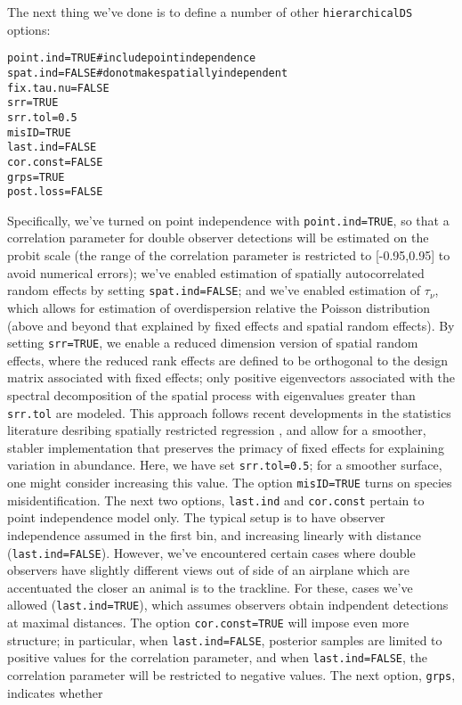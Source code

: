 \documentclass{article}\usepackage{graphicx, color}
\makeatletter
\newcommand{\hlcomment}[1]{\textcolor[rgb]{0.180392156862745,0.6,0.341176470588235}{#1}}%
\newenvironment{kframe}{%
 \def\at@end@of@kframe{}%
 \ifinner\ifhmode%
  \def\at@end@of@kframe{\end{minipage}}%
  \begin{minipage}{\columnwidth}%
 \fi\fi%
 \def\FrameCommand##1{\hskip\@totalleftmargin \hskip-\fboxsep
 \colorbox{shadecolor}{##1}\hskip-\fboxsep
     \hskip-\linewidth \hskip-\@totalleftmargin \hskip\columnwidth}%
 \MakeFramed {\advance\hsize-\width
   \@totalleftmargin\z@ \linewidth\hsize
   \@setminipage}}%
 {\par\unskip\endMakeFramed%
 \at@end@of@kframe}
\newenvironment{knitrout}{}{} %
\makeatother
\begin{document}
The next thing we've done is to define a number of other \texttt{hierarchicalDS} options:

\begin{knitrout}
\color{fgcolor}\begin{kframe}
\begin{alltt}
point.ind = TRUE  \hlcomment{#include point independence}
spat.ind = FALSE  \hlcomment{#do not make spatially independent}
fix.tau.nu = FALSE
srr = TRUE
srr.tol = 0.5
misID = TRUE
last.ind = FALSE
cor.const = FALSE
grps = TRUE
post.loss = FALSE
\end{alltt}
\end{kframe}
\end{knitrout}


Specifically, we've turned on point independence with \texttt{point.ind=TRUE}, so that a correlation parameter
for double observer detections will be estimated on the probit scale (the range of the correlation parameter is restricted to [-0.95,0.95] to avoid numerical errors); we've enabled estimation of spatially autocorrelated random effects by setting \texttt{spat.ind=FALSE}; and we've enabled estimation of $\tau_\nu$, which allows for estimation of overdispersion relative the Poisson distribution (above and beyond that explained by fixed effects and spatial random effects).  By setting \texttt{srr=TRUE}, we enable a reduced dimension version of spatial random effects, where the reduced rank effects are defined to be orthogonal to the design matrix associated with fixed effects; only positive eigenvectors associated with the spectral decomposition of the spatial process with eigenvalues greater than \texttt{srr.tol} are modeled.  This approach follows recent developments in the statistics literature desribing spatially restricted regression \citep[e.g.][]{HughesHaran2012,ReichEtAl2006}, and allow for a smoother, stabler implementation that preserves the primacy of fixed effects for explaining variation in abundance.  Here, we have set \texttt{srr.tol=0.5}; for a smoother surface, one might consider increasing this value.  The option \texttt{misID=TRUE} turns on species misidentification.  The next two options, \texttt{last.ind} and \texttt{cor.const} pertain to point independence model only.  The typical setup is to have observer independence assumed in the first bin, and increasing linearly with distance (\texttt{last.ind=FALSE}).  However, we've encountered certain cases where double observers have slightly different views out of side of an airplane which are accentuated the closer an animal is to the trackline.  For these, cases we've allowed (\texttt{last.ind=TRUE}), which assumes observers obtain indpendent detections at maximal distances.  The option \texttt{cor.const=TRUE} will impose even more structure; in particular, when \texttt{last.ind=FALSE}, posterior samples are limited to positive values for the correlation parameter, and when \texttt{last.ind=FALSE}, the correlation parameter will be restricted to negative values. The next option, \texttt{grps}, indicates whether
\end{document}
